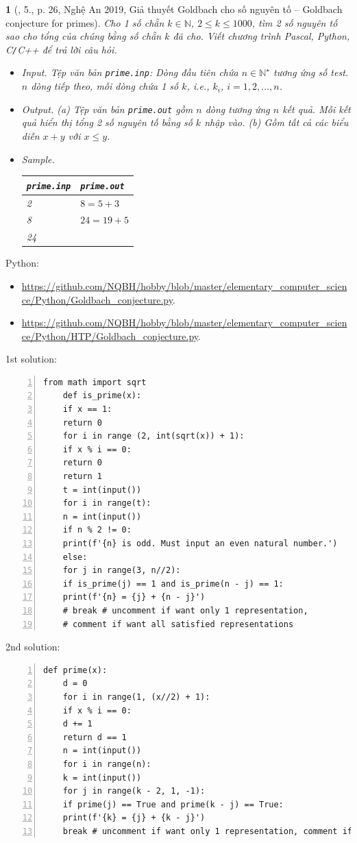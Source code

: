 \documentclass{article}
\newtheorem{baitoan}{}
\begin{document}
\begin{baitoan}[\cite{VietSTEM2021}, 5., p. 26, Nghệ An 2019, Giả thuyết Goldbach cho số nguyên tố -- Goldbach conjecture for primes]
	Cho 1 số chẵn $k\in\mathbb{N}$, $2\le k\le1000$, tìm 2 số nguyên tố sao cho tổng của chúng bằng số chẵn $k$ đã cho. Viết chương trình {\sf Pascal, Python, C{\tt/}C++} để trả lời câu hỏi.
	\begin{itemize}
		\item {\sf Input.} Tệp văn bản \verb|prime.inp|: Dòng đầu tiên chứa $n\in\mathbb{N}^\star$ tương ứng số test. $n$ dòng tiếp theo, mỗi dòng chứa 1 số $k$, i.e., $k_i$, $i = 1,2,\ldots,n$.
		\item {\sf Output.} (a) Tệp văn bản \verb|prime.out| gồm $n$ dòng tương ứng $n$ kết quả. Mỗi kết quả hiển thị tổng 2 số nguyên tố bằng số $k$ nhập vào. (b) Gồm tất cả các biểu diễn $x + y$ với $x\le y$.
		\item {\sf Sample.}
		\begin{table}[H]
			\centering
			\begin{tabular}{|l|l|}
				\hline
				{\tt prime.inp} & {\tt prime.out} \\
				\hline
				2 & $8 = 5 + 3$ \\
				8 & $24 = 19 + 5$ \\
				24 & \\
				\hline
			\end{tabular}
		\end{table}
	\end{itemize}
\end{baitoan}
\noindent Python:
\begin{itemize}
	\item \url{https://github.com/NQBH/hobby/blob/master/elementary_computer_science/Python/Goldbach_conjecture.py}.
	\item \url{https://github.com/NQBH/hobby/blob/master/elementary_computer_science/Python/HTP/Goldbach_conjecture.py}.
\end{itemize}
1st solution:
\begin{Verbatim}[numbers=left,xleftmargin=5mm]
	from math import sqrt
	def is_prime(x):
	if x == 1:
	return 0
	for i in range (2, int(sqrt(x)) + 1):
	if x % i == 0:
	return 0
	return 1
	t = int(input())
	for i in range(t):
	n = int(input())
	if n % 2 != 0:
	print(f'{n} is odd. Must input an even natural number.')
	else:
	for j in range(3, n//2):
	if is_prime(j) == 1 and is_prime(n - j) == 1:
	print(f'{n} = {j} + {n - j}')
	# break # uncomment if want only 1 representation,
	# comment if want all satisfied representations
\end{Verbatim}
2nd solution:
\begin{Verbatim}[numbers=left,xleftmargin=5mm]
	def prime(x):
	d = 0
	for i in range(1, (x//2) + 1):
	if x % i == 0:
	d += 1
	return d == 1
	n = int(input())
	for i in range(n):
	k = int(input())
	for j in range(k - 2, 1, -1):
	if prime(j) == True and prime(k - j) == True:
	print(f'{k} = {j} + {k - j}')
	break # uncomment if want only 1 representation, comment if want all satisfied representations
\end{Verbatim}
\end{document}
